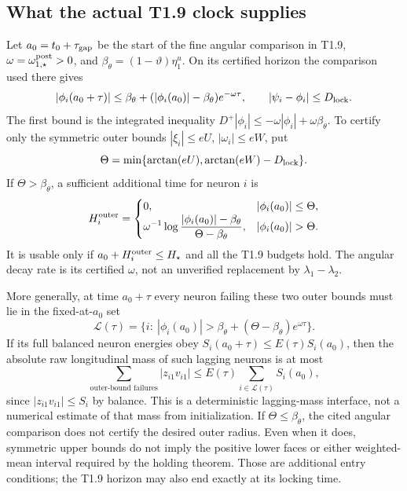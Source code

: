 \documentclass{article} %
\theoremstyle{plain}
\theoremstyle{definition}
\theoremstyle{remark}
\begin{document}
\subsection{What the actual T1.9 clock supplies}

Let $a_0=t_0+\tau_{\rm gap}$ be the start of the fine angular comparison
in T1.9, $\omega=\omega_{1,\star}^{\rm post}>0$, and
$\beta_\theta=(1-\vartheta)\eta_1^u$.
On its certified horizon the comparison used there gives
\[
 |\phi_i(a_0+\tau)|\le
 \beta_\theta+(|\phi_i(a_0)|-\beta_\theta)e^{-\omega\tau},
 \qquad |\psi_i-\phi_i|\le D_{\rm lock}.
\]
The first bound is the integrated inequality
$D^+|\phi_i|\le-\omega|\phi_i|+\omega\beta_\theta$.
To certify only the symmetric outer bounds
$|\xi_i|\le eU$, $|\omega_i|\le eW$, put
\[
 \Theta=\min\{\arctan(eU),\arctan(eW)-D_{\rm lock}\}.
\]
If $\Theta>\beta_\theta$, a sufficient additional time for neuron $i$ is
\[
 H_i^{\rm outer}=
 \begin{cases}
 0,&|\phi_i(a_0)|\le\Theta,\\
 \displaystyle\omega^{-1}\log
 \frac{|\phi_i(a_0)|-\beta_\theta}{\Theta-\beta_\theta},
       &|\phi_i(a_0)|>\Theta.
 \end{cases}
\]
It is usable only if $a_0+H_i^{\rm outer}\le H_\star$ and all the T1.9
budgets hold. The angular decay rate is its certified $\omega$, not an
unverified replacement by $\lambda_1-\lambda_2$.

More generally, at time $a_0+\tau$ every neuron failing these two outer
bounds must lie in the fixed-at-$a_0$ set
\[
 \mathcal L(\tau)=\{i:\ |\phi_i(a_0)|>
       \beta_\theta+(\Theta-\beta_\theta)e^{\omega\tau}\}.
\]
If its full balanced neuron energies obey
$S_i(a_0+\tau)\le E(\tau)S_i(a_0)$, then the absolute raw longitudinal
mass of such lagging neurons is at most
\[
 \sum_{\text{outer-bound failures}}|z_{i1}v_{i1}|
       \le E(\tau)\sum_{i\in\mathcal L(\tau)}S_i(a_0),
\]
since $|z_{i1}v_{i1}|\le S_i$ by balance.
This is a deterministic lagging-mass interface, not a numerical estimate
of that mass from initialization. If $\Theta\le\beta_\theta$, the cited
angular comparison does not certify the desired outer radius. Even when
it does, symmetric upper bounds do not imply the positive lower faces or
either weighted-mean interval required by the holding theorem. Those are
additional entry conditions; the T1.9 horizon may also end exactly at its
locking time.
\end{document}
